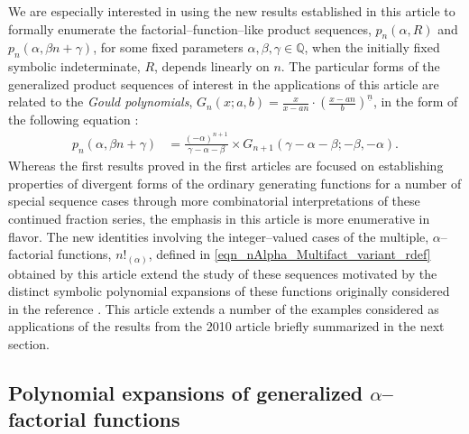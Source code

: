 \documentclass[12pt,reqno]{article}
\numberwithin{sfootnote}{section}
\numberwithin{equation}{section}
\theoremstyle{plain}
\theoremstyle{definition}
\theoremstyle{remark}
\newcommand{\FFactII}[2]{\ensuremath{#1^{\underline{#2}}}}
\newcommand{\MultiFactorial}[2]{\ensuremath{#1!_{\left(#2\right)}}}
\newcommand{\pn}[3]{\ensuremath{p_{#1}\left(#2, #3\right)}}
\begin{document}
We are especially interested in using the new results established in this 
article to formally enumerate the 
factorial--function--like product sequences, 
$\pn{n}{\alpha}{R}$ and $\pn{n}{\alpha}{\beta n + \gamma}$, for some fixed 
parameters $\alpha, \beta, \gamma \in \mathbb{Q}$, when the 
initially fixed symbolic indeterminate, $R$, depends linearly on $n$. 
The particular forms of the 
generalized product sequences of interest in the 
applications of this article are related to the \emph{Gould polynomials}, 
$G_n(x; a, b) = \frac{x}{x-an} \cdot \FFactII{\left(\frac{x-an}{b}\right)}{n}$, 
in the form of the following equation 
\citep[\S 3.4.2]{MULTIFACTJIS} \citep[\S 4.1.4]{UC}: 
\begin{align} 
\label{eqn_pnAlphaBetanpGamma_GouldPolyExp_Ident-stmt_v1} 
\pn{n}{\alpha}{\beta n + \gamma} & = 
     \frac{(-\alpha)^{n+1}}{\gamma-\alpha-\beta} \times 
     G_{n+1}\left(\gamma-\alpha-\beta; -\beta, -\alpha\right). 
\end{align} 
Whereas the first results proved in the first articles 
\citep{FLAJOLET80B,FLAJOLET82} 
are focused on establishing properties of divergent forms of the 
ordinary generating functions for a number of special sequence cases 
through more combinatorial interpretations of these 
continued fraction series, the emphasis in this article 
is more enumerative in flavor. 
The new identities involving the integer--valued cases of the 
multiple, $\alpha$--factorial functions, $\MultiFactorial{n}{\alpha}$, 
defined in \eqref{eqn_nAlpha_Multifact_variant_rdef} 
obtained by this article 
extend the study of these sequences motivated by the 
distinct symbolic polynomial expansions of these functions 
originally considered in the reference \citep{MULTIFACTJIS}. 
This article extends a number of the examples considered as 
applications of the results from the 2010 article 
briefly summarized in the next section. 

\subsection{Polynomial expansions of generalized $\alpha$--factorial functions} 
\label{subSection_GenAlphaFactorialTriangle_exps} 
\end{document}
